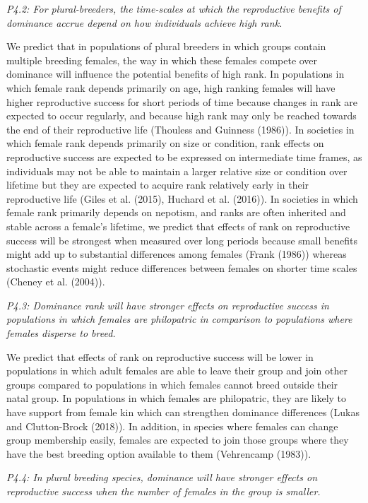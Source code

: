 \documentclass[
]{article}
\begin{document}
\emph{P4.2: For plural-breeders, the time-scales at which the
reproductive benefits of dominance accrue depend on how individuals
achieve high rank.}

We predict that in populations of plural breeders in which groups
contain multiple breeding females, the way in which these females
compete over dominance will influence the potential benefits of high
rank. In populations in which female rank depends primarily on age, high
ranking females will have higher reproductive success for short periods
of time because changes in rank are expected to occur regularly, and
because high rank may only be reached towards the end of their
reproductive life (Thouless and Guinness (1986)). In societies in which
female rank depends primarily on size or condition, rank effects on
reproductive success are expected to be expressed on intermediate time
frames, as individuals may not be able to maintain a larger relative
size or condition over lifetime but they are expected to acquire rank
relatively early in their reproductive life (Giles et al. (2015),
Huchard et al. (2016)). In societies in which female rank primarily
depends on nepotism, and ranks are often inherited and stable across a
female's lifetime, we predict that effects of rank on reproductive
success will be strongest when measured over long periods because small
benefits might add up to substantial differences among females (Frank
(1986)) whereas stochastic events might reduce differences between
females on shorter time scales (Cheney et al. (2004)).

\emph{P4.3: Dominance rank will have stronger effects on reproductive
success in populations in which females are philopatric in comparison to
populations where females disperse to breed.}

We predict that effects of rank on reproductive success will be lower in
populations in which adult females are able to leave their group and
join other groups compared to populations in which females cannot breed
outside their natal group. In populations in which females are
philopatric, they are likely to have support from female kin which can
strengthen dominance differences (Lukas and Clutton-Brock (2018)). In
addition, in species where females can change group membership easily,
females are expected to join those groups where they have the best
breeding option available to them (Vehrencamp (1983)).

\emph{P4.4: In plural breeding species, dominance will have stronger
effects on reproductive success when the number of females in the group
is smaller.}
\end{document}
